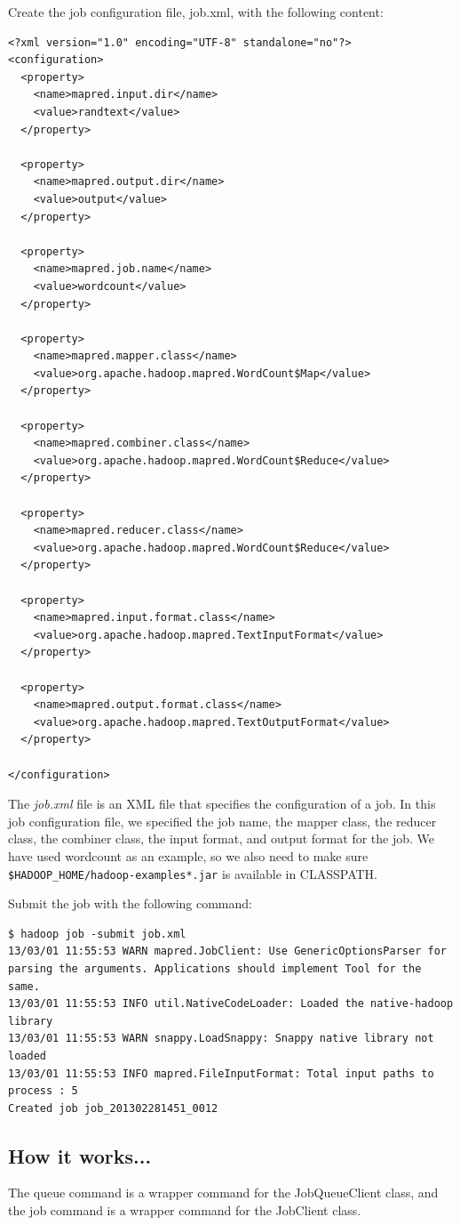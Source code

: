 Create the job configuration file, job.xml, with the following content:
\begin{verbatim}
<?xml version="1.0" encoding="UTF-8" standalone="no"?>
<configuration>
  <property>
    <name>mapred.input.dir</name>
    <value>randtext</value>
  </property>

  <property>
    <name>mapred.output.dir</name>
    <value>output</value>
  </property>

  <property>
    <name>mapred.job.name</name>
    <value>wordcount</value>
  </property>

  <property>
    <name>mapred.mapper.class</name>
    <value>org.apache.hadoop.mapred.WordCount$Map</value>
  </property>

  <property>
    <name>mapred.combiner.class</name>
    <value>org.apache.hadoop.mapred.WordCount$Reduce</value>
  </property>

  <property>
    <name>mapred.reducer.class</name>
    <value>org.apache.hadoop.mapred.WordCount$Reduce</value>
  </property>

  <property>
    <name>mapred.input.format.class</name>
    <value>org.apache.hadoop.mapred.TextInputFormat</value>
  </property>

  <property>
    <name>mapred.output.format.class</name>
    <value>org.apache.hadoop.mapred.TextOutputFormat</value>
  </property>

</configuration>
\end{verbatim}
The \emph{job.xml} file is an XML file that specifies the configuration of a job. In this job configuration file, we specified the job name, the mapper class, the reducer class, the combiner class, the input format, and output format for the job. We have used wordcount as an example, so we also need to make sure \verb|$HADOOP_HOME/hadoop-examples*.jar| is available in CLASSPATH.

Submit the job with the following command:
\begin{verbatim}
$ hadoop job -submit job.xml
13/03/01 11:55:53 WARN mapred.JobClient: Use GenericOptionsParser for parsing the arguments. Applications should implement Tool for the same.
13/03/01 11:55:53 INFO util.NativeCodeLoader: Loaded the native-hadoop library
13/03/01 11:55:53 WARN snappy.LoadSnappy: Snappy native library not loaded
13/03/01 11:55:53 INFO mapred.FileInputFormat: Total input paths to process : 5
Created job job_201302281451_0012
\end{verbatim}
\subsection*{How it works...}
The queue command is a wrapper command for the JobQueueClient class, and the job command is a wrapper command for the JobClient class.

